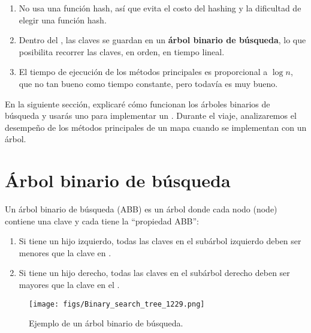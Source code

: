 \documentclass[12pt]{book}
\theoremstyle{exercise}
\begin{document}
\begin{enumerate}

\item
  No usa una función hash, así que evita el costo del hashing
  y la dificultad de elegir una función hash.

\item
  Dentro del , las claves se guardan en un
  \textbf{árbol binario de búsqueda}, lo que posibilita recorrer las
  claves, en orden, en tiempo lineal.

\item
  El tiempo de ejecución de los métodos principales es proporcional a $\log n$,
  que no tan bueno como tiempo constante, pero todavía es muy bueno.

\end{enumerate}

En la siguiente sección, explicaré cómo funcionan los árboles binarios de búsqueda
y usarás uno para implementar un . Durante el viaje, analizaremos el
desempeño de los métodos principales de un mapa cuando se implementan con un árbol.



\section{Árbol binario de búsqueda}
\label{binary-search-tree}


Un árbol binario de búsqueda (ABB) es un árbol donde cada nodo (node) contiene
una clave y cada  tiene la ``propiedad ABB'':

\begin{enumerate}

\item
  Si  tiene un hijo izquierdo, todas las claves en el subárbol izquierdo deben
  ser menores que la clave en .

\item
  Si  tiene un hijo derecho, todas las claves en el subárbol derecho deben
  ser mayores que la clave en el .

\end{enumerate}

\begin{figure}
\centering
\texttt{[image: figs/Binary\_search\_tree\_1229.png]}
\caption{Ejemplo de un árbol binario de búsqueda.}
\label{fig-bst}
\end{figure}
\end{document}
